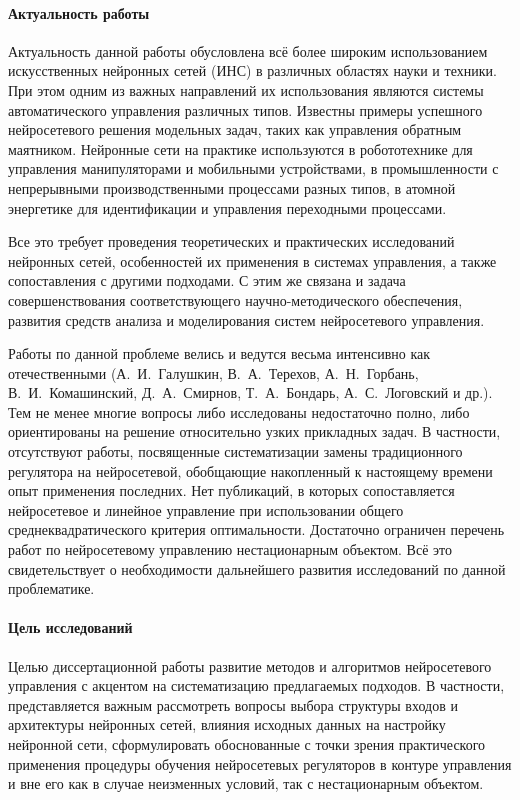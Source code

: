 
\paragraph{Актуальность работы}
Актуальность данной работы обусловлена всё более широким
использованием искусственных нейронных сетей (ИНС) в различных
областях науки и техники.  При этом одним из важных направлений их
использования являются системы автоматического управления различных
типов.  Известны примеры успешного нейросетевого решения модельных
задач, таких как управления обратным маятником.  Нейронные сети на
практике используются в робототехнике для управления манипуляторами и
мобильными устройствами, в промышленности с непрерывными
производственными процессами разных типов, в атомной энергетике для
идентификации и управления переходными процессами.

Все это требует проведения теоретических и практических исследований
нейронных сетей, особенностей их применения в системах управления, а
также сопоставления с другими подходами.  С этим же связана и задача
совершенствования соответствующего научно-методического обеспечения,
развития средств анализа и моделирования систем нейросетевого
управления.

Работы по данной проблеме велись и ведутся весьма интенсивно как
отечественными (А.~И.~Галушкин, В.~А.~Терехов, А.~Н.~Горбань,
В.~И.~Комашинский, Д.~А.~Смирнов, Т.~А.~Бондарь, А.~С.~Логовский и
др.). Тем не менее многие вопросы либо исследованы недостаточно полно,
либо ориентированы на решение относительно узких прикладных задач.  В
частности, отсутствуют работы, посвященные систематизации замены
традиционного регулятора на нейросетевой, обобщающие накопленный к
настоящему времени опыт применения последних.  Нет публикаций, в
которых сопоставляется нейросетевое и линейное управление при
использовании общего среднеквадратического критерия оптимальности.
Достаточно ограничен перечень работ по нейросетевому управлению
нестационарным объектом.  Всё это свидетельствует о необходимости
дальнейшего развития исследований по данной проблематике.

\paragraph{Цель исследований}
Целью диссертационной работы развитие методов и алгоритмов
нейросетевого управления с акцентом на систематизацию предлагаемых
подходов.  В частности, представляется важным рассмотреть вопросы
выбора структуры входов и архитектуры нейронных сетей, влияния
исходных данных на настройку нейронной сети, сформулировать
обоснованные с точки зрения практического применения процедуры
обучения нейросетевых регуляторов в контуре управления и вне его как в
случае неизменных условий, так с нестационарным объектом.

